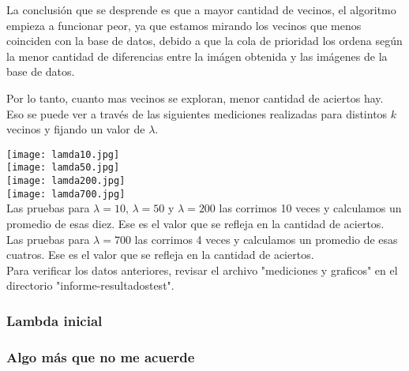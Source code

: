 La conclusión que se desprende es que a mayor cantidad de vecinos, el algoritmo empieza a funcionar peor, ya que estamos mirando los vecinos que menos coinciden con la base de datos, debido a que la cola de prioridad los ordena según la menor cantidad de diferencias entre la imágen obtenida y las imágenes de la base de datos. 

Por lo tanto, cuanto mas vecinos se exploran, menor cantidad de aciertos hay. Eso se puede ver a través de las siguientes mediciones realizadas para distintos $k$ vecinos y fijando un valor de $\lambda$.

\texttt{[image: lamda10.jpg]}\\
\texttt{[image: lamda50.jpg]}\\
\texttt{[image: lamda200.jpg]}\\
\texttt{[image: lamda700.jpg]}\\

Las pruebas para $\lambda = 10$, $\lambda = 50$ y $\lambda = 200$ las corrimos 10 veces y calculamos un promedio de esas diez. Ese es el valor que se refleja en la cantidad de aciertos. \\

Las pruebas para $\lambda = 700$ las corrimos 4 veces y calculamos un promedio de esas cuatros. Ese es el valor que se refleja en la cantidad de aciertos. \\

Para verificar los datos anteriores, revisar el archivo "mediciones y graficos" en el directorio "informe-resultadostest".




\subsubsection{Lambda inicial}

\subsubsection{Algo más que no me acuerde}
